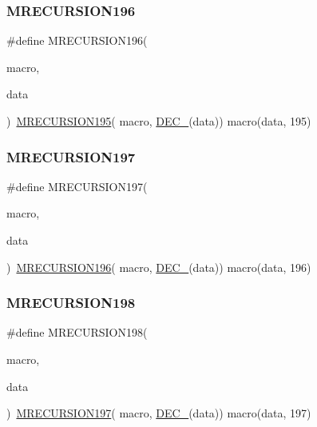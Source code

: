 \subsubsection{\texorpdfstring{MRECURSION196}{MRECURSION196}}
{\footnotesize\ttfamily \#define M\+R\+E\+C\+U\+R\+S\+I\+O\+N196(\begin{DoxyParamCaption}\item[{}]{macro,  }\item[{}]{data }\end{DoxyParamCaption})~\mbox{\hyperlink{group__group__sam0__utils__mrecursion_ga4f360a4ac5882dfa8c9c2ce94e1bf496}{M\+R\+E\+C\+U\+R\+S\+I\+O\+N195}}(  macro, \mbox{\hyperlink{group__group__sam0__utils__mrecursion_ga1d23d683797679dca8c3512a54a5dcae}{D\+E\+C\+\_\+}}(data))   macro(data, 195)}

\mbox{\label{group__group__sam0__utils__mrecursion_gae419c59f8b191d6b6dd3c3c3e94448b6}} 
\subsubsection{\texorpdfstring{MRECURSION197}{MRECURSION197}}
{\footnotesize\ttfamily \#define M\+R\+E\+C\+U\+R\+S\+I\+O\+N197(\begin{DoxyParamCaption}\item[{}]{macro,  }\item[{}]{data }\end{DoxyParamCaption})~\mbox{\hyperlink{group__group__sam0__utils__mrecursion_gad4a12ea05cb3470468f67b26d9459f8f}{M\+R\+E\+C\+U\+R\+S\+I\+O\+N196}}(  macro, \mbox{\hyperlink{group__group__sam0__utils__mrecursion_ga1d23d683797679dca8c3512a54a5dcae}{D\+E\+C\+\_\+}}(data))   macro(data, 196)}

\mbox{\label{group__group__sam0__utils__mrecursion_gae809796894cf07b1f6d2c9e04b473764}} 
\subsubsection{\texorpdfstring{MRECURSION198}{MRECURSION198}}
{\footnotesize\ttfamily \#define M\+R\+E\+C\+U\+R\+S\+I\+O\+N198(\begin{DoxyParamCaption}\item[{}]{macro,  }\item[{}]{data }\end{DoxyParamCaption})~\mbox{\hyperlink{group__group__sam0__utils__mrecursion_gae419c59f8b191d6b6dd3c3c3e94448b6}{M\+R\+E\+C\+U\+R\+S\+I\+O\+N197}}(  macro, \mbox{\hyperlink{group__group__sam0__utils__mrecursion_ga1d23d683797679dca8c3512a54a5dcae}{D\+E\+C\+\_\+}}(data))   macro(data, 197)}


